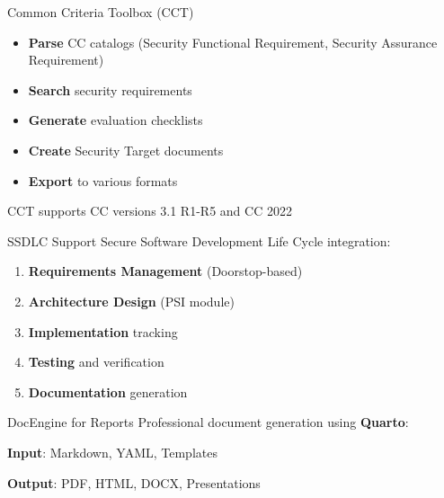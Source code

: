 \documentclass[
  11pt,
  ignorenonframetext,
  aspectratio=169,
]{beamer}
\providecommand{\tightlist}{%
  \setlength{\itemsep}{0pt}\setlength{\parskip}{0pt}}\usepackage{longtable,booktabs,array}
\begin{document}
\begin{frame}{Common Criteria Toolbox (CCT)}
\label{common-criteria-toolbox-cct}
\begin{itemize}[<+->]
\tightlist
\item
  \textbf{Parse} CC catalogs (Security Functional Requirement, Security
  Assurance Requirement)
\item
  \textbf{Search} security requirements
\item
  \textbf{Generate} evaluation checklists
\item
  \textbf{Create} Security Target documents
\item
  \textbf{Export} to various formats
\end{itemize}

\pause

\begin{tcolorbox}[enhanced jigsaw, colback=white, opacityback=0, coltitle=black, toptitle=1mm, colframe=quarto-callout-tip-color-frame, toprule=.15mm, rightrule=.15mm, bottomtitle=1mm, opacitybacktitle=0.6, title=\textcolor{quarto-callout-tip-color}{\faLightbulb}\hspace{0.5em}{Did you know?}, colbacktitle=quarto-callout-tip-color!10!white, arc=.35mm, left=2mm, titlerule=0mm, breakable, bottomrule=.15mm, leftrule=.75mm]

CCT supports CC versions 3.1 R1-R5 and CC 2022

\end{tcolorbox}
\end{frame}

\begin{frame}{SSDLC Support}
\label{ssdlc-support}
Secure Software Development Life Cycle integration:

\begin{enumerate}
\tightlist
\item
  \textbf{Requirements Management} (Doorstop-based)
\item
  \textbf{Architecture Design} (PSI module)
\item
  \textbf{Implementation} tracking
\item
  \textbf{Testing} and verification
\item
  \textbf{Documentation} generation
\end{enumerate}
\end{frame}

\begin{frame}{DocEngine for Reports}
\label{docengine-for-reports}
Professional document generation using \textbf{Quarto}:

\textbf{Input}: Markdown, YAML, Templates

\textbf{Output}: PDF, HTML, DOCX, Presentations
\end{frame}
\end{document}
